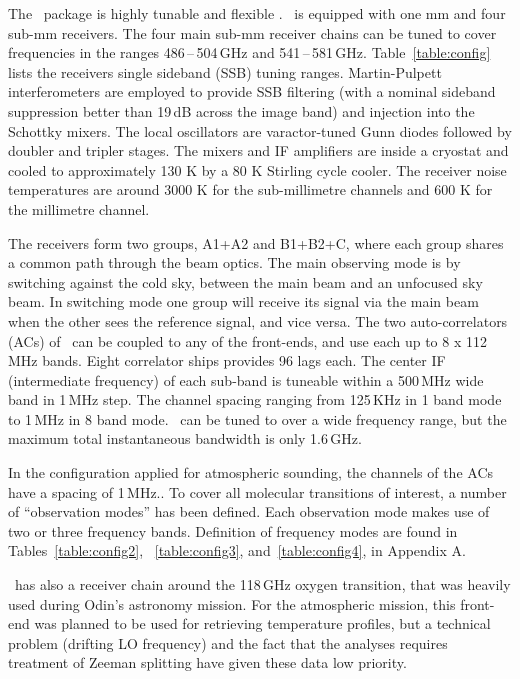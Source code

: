 The \smr\ package is highly tunable and flexible \citep{frisk:theod:03}.
\smr\ is equipped with one mm and four sub-mm receivers.
The four main sub-mm receiver chains can be tuned to cover
frequencies in the ranges 486\,--\,504\,GHz and 541\,--\,581\,GHz.
Table~\ref{table:config} lists the receivers single sideband (SSB) tuning ranges.
Martin-Pulpett interferometers are employed to provide SSB filtering 
(with a nominal sideband suppression better than 19\,dB across
the image band) and injection into the Schottky mixers.
The local oscillators are varactor-tuned Gunn diodes followed by
doubler and tripler stages. The mixers and IF amplifiers are inside a cryostat and
cooled to approximately 130 K by a 80 K Stirling cycle cooler. The receiver
noise temperatures are around 3000 K for
the sub-millimetre channels and 600 K for the millimetre channel.

The receivers form two groups, A1+A2 and B1+B2+C, where each group shares
a common path through the beam optics. 
The main observing mode is by switching against the cold sky, between the
main beam and an unfocused sky beam. In switching mode one group will
receive its signal via the main beam when the other sees the reference signal,
and vice versa.
The two auto-correlators (ACs) of \smr\ can be coupled to any of the front-ends,
and use each up to 8 x 112 MHz bands.
Eight correlator ships provides 96 lags each.
The center IF (intermediate frequency) of each sub-band is tuneable
within a 500\,MHz wide band in 1\,MHz step. The channel spacing
ranging from 125\,KHz in 1 band mode to 1\,MHz in 8 band mode.
\smr\ can be tuned to over a wide frequency range, but the maximum total instantaneous
bandwidth is only 1.6\,GHz. 

In the configuration applied for
atmospheric sounding, the channels of the ACs have a spacing of 1\,MHz..
To cover all molecular transitions of interest, a 
number of ``observation modes'' has been defined. Each observation mode makes
use of two or three frequency bands. 
Definition of frequency modes are found in Tables~\ref{table:config2}, 
~\ref{table:config3}, and~\ref{table:config4}, in Appendix A.

\smr\ has also a receiver chain around the 118\,GHz oxygen transition, that was
heavily used during Odin's astronomy mission. For the atmospheric mission, this
front-end was planned to be used for retrieving temperature profiles, but a
technical problem (drifting LO frequency) and the fact that the analyses
requires treatment of Zeeman splitting have given these data low priority. 

